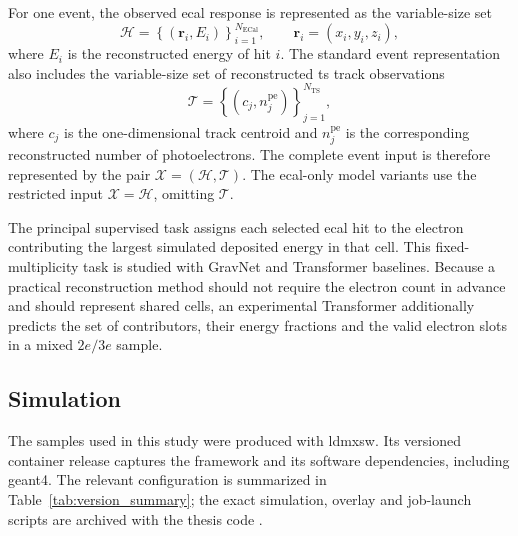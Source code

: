 For one event, the observed \gls{ecal} response is represented as the
variable-size set
\begin{equation}
    \mathcal{H} =
    \left\{
    \left(\boldsymbol{r}_i,E_i\right)
    \right\}_{i=1}^{N_{\mathrm{ECal}}},
    \qquad
    \boldsymbol{r}_i=(x_i,y_i,z_i),
\end{equation}
where \(E_i\) is the reconstructed energy of hit \(i\). The standard event
representation also includes the variable-size set of
reconstructed \gls{ts} track observations
\begin{equation}
    \mathcal{T} =
    \left\{
    \left(c_j,n^{\mathrm{pe}}_j\right)
    \right\}_{j=1}^{N_{\mathrm{TS}}},
\end{equation}
where \(c_j\) is the one-dimensional track centroid and
\(n^{\mathrm{pe}}_j\) is the corresponding reconstructed number of
photoelectrons. The complete event input is therefore represented by the pair
\(\mathcal{X}=(\mathcal{H},\mathcal{T})\). The \gls{ecal}-only model variants
use the restricted input \(\mathcal{X}=\mathcal{H}\), omitting
\(\mathcal{T}\).

The principal supervised task assigns each selected \gls{ecal} hit to the
electron contributing the largest simulated deposited energy in that cell.
This fixed-multiplicity task is studied with GravNet and Transformer baselines.
Because a practical reconstruction method should not require the electron
count in advance and should represent shared cells, an experimental
Transformer additionally predicts the set of contributors, their energy
fractions and the valid electron slots in a mixed \(2e/3e\) sample.

\subsection{Simulation}

The samples used in this study were produced with \gls{ldmxsw}. Its
versioned container release captures the framework and its software
dependencies, including \gls{geant4}. The relevant configuration is summarized
in Table~\ref{tab:version_summary}; the exact simulation, overlay and
job-launch scripts are archived with the thesis code
\cite{petren2026-msceng-ldmx-github}. 

